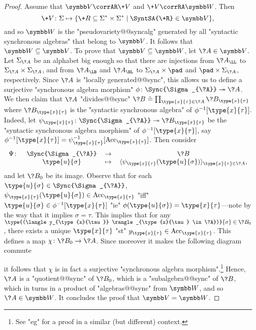 \begin{proof}
	 Assume that $\B{V} \corrAR \+V$ and $\+V \corrRA \B{W}$.
	Then
	\[\+V\colon \Sigma \mapsto \{\+R \subseteq \Sigma^*\times \Sigma^* \mid \SyntSA{\+R} \in \B{V}\},\]
	and so $\B{W}$ is the "pseudovariety@@syncalg" generated by all "syntactic synchronous algebras" that 
	belong to $\B{V}$.
	It follows that $\B{W} \subseteq \B{V}$.
	To prove that $\B{V} \subseteq \B{W}$, let $\?A \in \B{V}$.
	Let $\Sigma_{\?A}$ be an alphabet big enough so that
	there are injections from $\?A_{\LL}$ to $\Sigma_{\?A}\times \Sigma_{\?A}$,
	and from $\?A_{\LB}$ and $\?A_{\BL}$ to $\Sigma_{\?A} \times \pad$ and $\pad \times \Sigma_{\?A}$,
	respectively. Since $\?A$ is "locally generated@@sync",
	this allows us to define a surjective "synchronous algebra morphism"
	$\phi\colon \Sync{\Sigma_{\?A}} \surj \?A$.
	We then claim that $\?A$ "divides@@sync"
	$\?B \defeq \prod_{\type{x}{\tau} \in \?A} \?B_{\type{x}{\tau}}$
	where $\?B_{\type{x}{\tau}}$ is the "syntactic synchronous algebra"
	of $\phi^{-1}[\type{x}{\tau}]$.
	Indeed, let $\psi_{\type{x}{\tau}} \colon \Sync{\Sigma_{\?A}} \surj \?B_{\type{x}{\tau}}$
	be the "syntactic synchronous algebra morphism" of $\phi^{-1}[\type{x}{\tau}]$, say
	$\phi^{-1}[\type{x}{\tau}] = \psi_{\type{x}{\tau}}^{-1}[\Acc_{\type{x}{\tau}}]$.
	Then consider
	\[\begin{tabular}{rccc}
		$\Psi\colon$ & $\Sync{\Sigma_{\?A}}$ & $\to$ & $\?B$ \\
		& $\type{u}{\sigma}$ & $\mapsto$ &
			$\langle \psi_{\type{x}{\tau}}(\type{u}{\sigma}) \rangle_{\type{x}{\tau} \in \?A}$,
	\end{tabular}\]
	and let $\?B_0$ be its image. Observe that for each $\type{u}{\sigma} \in \Sync{\Sigma_{\?A}}$,
	$\psi_{\type{x}{\tau}}(\type{u}{\sigma}) \in \Acc_{\type{x}{\tau}}$ "iff"
	$\type{u}{\sigma} \in \phi^{-1}[\type{x}{\tau}]$ "ie" $\phi(\type{u}{\sigma}) = \type{x}{\tau}$---note by the way that it implies $\sigma = \tau$.
	This implies that for any $\type{(\langle y_{\type{x}{\tau}} \rangle_{\type{x}{\tau} \in \?A})}{\sigma} \in \?B_0$, there exists a unique $\type{x}{\tau}$ "st"
	$y_{\type{x}{\tau}} \in \Acc_{\type{x}{\tau}}$. This defines a map
	$\chi\colon \?B_0 \to \?A$. Since moreover it makes the following diagram commute
	
	\begin{center}\end{center}
	it follows that $\chi$ is in fact a surjective "synchronous algebra morphism".\footnote{See "eg" \cite[Lemma 3.2, p.~10]{bojanczyk_recognisable_2015} for a proof in a similar (but different) context.} Hence, $\?A$ is a "quotient@@sync" of $\?B_0$, which is a "subalgebra@@sync" of
	$\?B$, which in turns in a product of "algebras@@sync" from $\B{W}$, and so $\?A \in \B{W}$.
	It concludes the proof that $\B{V} = \B{W}$.


\end{proof}
